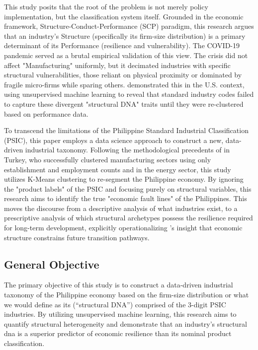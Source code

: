 \documentclass[acmtog, nonacm]{acmart}
\begin{document}
This study posits that the root of the problem is not merely policy implementation, but the classification system itself. Grounded in the economic framework,  Structure-Conduct-Performance (SCP) paradigm, this research argues that an industry's Structure (specifically its firm-size distribution) is a primary determinant of its Performance (resilience and vulnerability). The COVID-19 pandemic served as a brutal empirical validation of this view. The crisis did not affect "Manufacturing" uniformly, but it decimated industries with specific structural vulnerabilities, those reliant on physical proximity or dominated by fragile micro-firms while sparing others. \citet{nava2021} demonstrated this in the U.S. context, using unsupervised machine learning to reveal that standard industry codes failed to capture these divergent "structural DNA" traits until they were re-clustered based on performance data.

To transcend the limitations of the Philippine Standard Industrial Classification (PSIC), this paper employs a data science approach to construct a new, data-driven industrial taxonomy. Following the methodological precedents of \citet{karaca2018} in Turkey, who successfully clustered manufacturing sectors using only establishment and employment counts and \citet{wachs2022} in the energy sector, this study utilizes K-Means clustering to re-segment the Philippine economy. By ignoring the "product labels" of the PSIC and focusing purely on structural variables, this research aims to identify the true "economic fault lines" of the Philippines. This moves the discourse from a descriptive analysis of what industries exist, to a prescriptive analysis of which structural archetypes possess the resilience required for long-term development, explicitly operationalizing \citet{shutters2024}'s insight that economic structure constrains future transition pathways.

\subsection{General Objective}
The primary objective of this study is to construct a data-driven industrial taxonomy of the Philippine economy based on the firm-size distribution or what we would define as its (``structural DNA'') comprised of the 3-digit PSIC industries. By utilizing unsupervised machine learning, this research aims to quantify structural heterogeneity and demonstrate that an industry's structural dna is a superior predictor of economic resilience than its nominal product classification.
\end{document}

